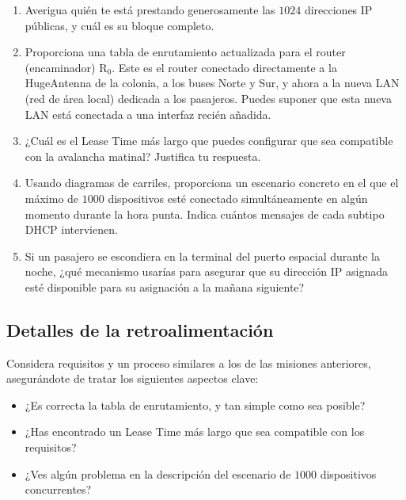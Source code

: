 \begin{enumerate}[itemsep=0.1cm]
\item Averigua quién te está prestando generosamente las $1024$ direcciones IP públicas, y cuál es su bloque completo.

\item Proporciona una tabla de enrutamiento actualizada para el router (encaminador) $\textrm{R}_0$. Este es el router conectado directamente a la \mbox{HugeAntenna\texttrademark} de la colonia, a los buses Norte y Sur, y ahora a la nueva LAN (red de área local) dedicada a los pasajeros. Puedes suponer que esta nueva LAN está conectada a una interfaz recién añadida.

\item ¿Cuál es el Lease Time más largo que puedes configurar que sea compatible con la avalancha matinal? Justifica tu respuesta.

\item Usando diagramas de carriles, proporciona un escenario concreto en el que el máximo de $1000$ dispositivos esté conectado simultáneamente en algún momento durante la hora punta. Indica cuántos mensajes de cada subtipo DHCP intervienen.

\item Si un pasajero se escondiera en la terminal del puerto espacial durante la noche, ¿qué mecanismo usarías para asegurar que su dirección IP asignada esté disponible para su asignación a la mañana siguiente?

\end{enumerate}


\subsection*{Detalles de la retroalimentación}

Considera requisitos y un proceso similares a los de las misiones anteriores, asegurándote de tratar los siguientes aspectos clave:
\begin{itemize}
\item ¿Es correcta la tabla de enrutamiento, y tan simple como sea posible?
\item ¿Has encontrado un Lease Time más largo que sea compatible con los requisitos?
\item ¿Ves algún problema en la descripción del escenario de $1000$ dispositivos concurrentes?
\end{itemize}

